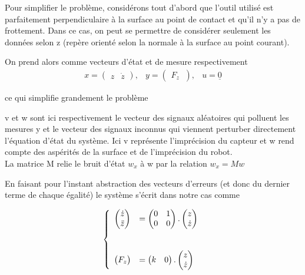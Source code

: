\documentclass[12pt,twoside,a4paper]{article}
\begin{document}
Pour simplifier le problème, considérons tout d'abord que l'outil utilisé est parfaitement perpendiculaire à la surface au point de contact et qu'il n'y a pas de frottement. Dans ce cas, on peut se permettre de considérer seulement les données selon z (repère orienté selon la normale à la surface au point courant).

On prend alors comme vecteurs d'état et de mesure respectivement
$$
\begin{array}{ccc}
x =  \begin{pmatrix} z & \dot{z} \end{pmatrix} 
,   & 
y= \begin{pmatrix}
 F_z \
\end{pmatrix},   &
u = \underline{0}
\end{array}
$$

ce qui simplifie grandement le problème

\vspace{1cm}




v et w sont ici respectivement le vecteur des signaux aléatoires qui polluent les mesures y et le vecteur  des signaux inconnus qui viennent perturber directement l'équation d'état du système. Ici  v représente l'imprécision du capteur et w rend compte des aspérités de la surface et de l'imprécision du robot. \\
La matrice M relie le bruit d'état $w_x$ à w par la relation $w_x = Mw$

\noindent
En faisant pour l'instant abstraction des vecteurs d'erreurs (et donc du dernier terme de chaque égalité) le système s'écrit dans notre cas comme  

$$
\left\{ 
\begin{array}{ll}
        \begin{pmatrix} \dot{z} \\ \ddot{z} \end{pmatrix} 
        &= \begin{pmatrix}
        0 & 1 \\
        0 & 0 \\ 
        \end{pmatrix}.
        \begin{pmatrix} z  \\ \dot{z} \end{pmatrix} \\
        \vspace{0.5cm} \\
        \begin{pmatrix} F_z  \end{pmatrix}
         &= \begin{pmatrix} 
         k & 0
	\end{pmatrix}.
	 \begin{pmatrix} z \\  \dot{z} \end{pmatrix} \\
\end{array}
\right.
$$
\end{document}
